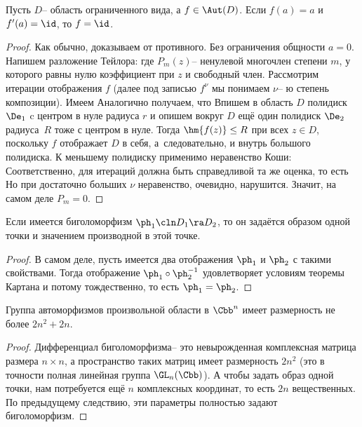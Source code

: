 \documentclass[a4paper]{article}
\begin{document}
\begin{theorem}[А.\,Картана]
Пусть $D$-- область ограниченного вида, а $f \in \Aut(D)$. Если $f(a) = a$ и $f'(a) = \id$, то
$f = \id$.
\end{theorem}
\begin{proof}
Как обычно, доказываем от противного. Без ограничения общности $a = 0$. Напишем разложение Тейлора:
где $P_m(z)$-- ненулевой многочлен степени $m$, у которого равны нулю коэффициент при $z$ и свободный член.
Рассмотрим итерации отображения $f$ (далее под записью $f^\nu$ мы понимаем $\nu$-- ю степень композиции).
Имеем
Аналогично получаем, что
Впишем в область $D$ полидиск $\De_1$ c центром в нуле радиуса $r$ и опишем вокруг $D$ ещё один
полидиск $\De_2$ радиуса~$R$ тоже с центром в нуле. Тогда $\hm{f(z)} \le R$ при всех $z \in D$, поскольку
$f$ отображает $D$ в себя, а~следовательно, и внутрь большого полидиска.
К меньшему полидиску применимо неравенство Коши:
Соответственно, для итераций должна быть справедливой та же оценка, то есть
Но при достаточно больших $\nu$ неравенство, очевидно, нарушится. Значит, на самом деле $P_m = 0$.
\end{proof}

\begin{imp}
Если имеется биголоморфизм $\ph_1\cln D_1 \ra D_2$, то он задаётся образом одной точки и значением
производной в этой точке.
\end{imp}
\begin{proof}
В самом деле, пусть имеется два отображения $\ph_1$ и $\ph_2$ с такими свойствами. Тогда
отображение $\ph_1\circ \ph_2^{-1}$ удовлетворяет условиям теоремы Картана и потому тождественно,
то есть $\ph_1 = \ph_2$.
\end{proof}

\begin{imp}
Группа автоморфизмов произвольной области в $\Cbb^n$ имеет размерность не более $2n^2+2n$.
\end{imp}
\begin{proof}
Дифференциал биголоморфизма-- это невырожденная комплексная матрица размера $n\times n$, а пространство
таких матриц имеет размерность $2n^2$ (это в точности полная линейная группа $\GL_n(\Cbb)$).
А чтобы задать образ одной точки, нам потребуется ещё $n$ комплексных координат, то есть $2n$ вещественных.
По предыдущему следствию, эти параметры полностью задают биголоморфизм.
\end{proof}
\end{document}
